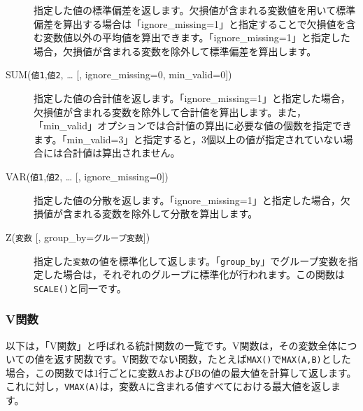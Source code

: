 \documentclass[
  12pt,
  a5jpaper,
  lualatex, ja=standard]{bxjsbook}
\begin{document}
\begin{description}
指定した値の標準偏差を返します。欠損値が含まれる変数値を用いて標準偏差を算出する場合は「ignore\_missing=1」と指定することで欠損値を含む変数値以外の平均値を算出できます。「ignore\_missing=1」と指定した場合，欠損値が含まれる変数を除外して標準偏差を算出します。
\item[SUM(\texttt{値1},\texttt{値2}, \ldots{} {[}, ignore\_missing=0, min\_valid=0{]})]
指定した値の合計値を返します。「ignore\_missing=1」と指定した場合，欠損値が含まれる変数を除外して合計値を算出します。また，「min\_valid」オプションでは合計値の算出に必要な値の個数を指定できます。「min\_valid=3」と指定すると，3個以上の値が指定されていない場合には合計値は算出されません。
\item[VAR(\texttt{値1},\texttt{値2}, \ldots{} {[}, ignore\_missing=0{]})]
指定した値の分散を返します。「ignore\_missing=1」と指定した場合，欠損値が含まれる変数を除外して分散を算出します。
\item[Z(\texttt{変数} {[}, group\_by=\texttt{グループ変数}{]})]
指定した\texttt{変数}の値を標準化して返します。「\texttt{group\_by}」でグループ変数を指定した場合は，それぞれのグループに標準化が行われます。この関数は\texttt{SCALE()}と同一です。
\end{description}

\hypertarget{vux95a2ux6570}{%
\subsubsection*{V関数}\label{vux95a2ux6570}}

以下は，「V関数」と呼ばれる統計関数の一覧です。V関数は，その変数全体についての値を返す関数です。V関数でない関数，たとえば\texttt{MAX()}で\texttt{MAX(A,B)}とした場合，この関数では1行ごとに変数AおよびBの値の最大値を計算して返します。これに対し，\texttt{VMAX(A)}は，変数Aに含まれる値すべてにおける最大値を返します。
\end{document}
